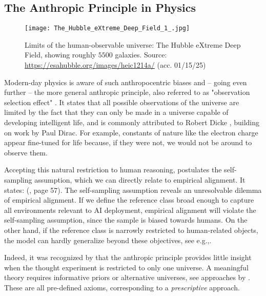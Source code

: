 \documentclass{article}
\theoremstyle{plain}
\theoremstyle{definition}
\theoremstyle{remark}
\begin{document}
\subsection{The Anthropic Principle in Physics}\label{sec:physics}

\begin{figure}
    \centering
    \texttt{[image: The\_Hubble\_eXtreme\_Deep\_Field\_1\_.jpg]}
    \caption{Limits of the human-observable universe: The Hubble eXtreme Deep Field, showing roughly $5500$ galaxies. Source: \url{https://esahubble.org/images/heic1214a/} (acc. 01/15/25)}
    \label{fig:enter-label}
\end{figure}

Modern-day physics is aware of such anthropocentric biases and -- going even further -- the more general anthropic principle, also referred to as "observation selection effect" \cite{bostrom2000observational,bostrom2002anthropic, carter1983principle}. It states that all possible observations of the universe are limited by the fact that they can only be made in a universe capable of developing intelligent life, and is commonly attributed to Robert Dicke \cite{dicke1961dirac,dicke1957gravitation}, building on work by Paul Dirac. For example, constants of nature like the electron charge appear fine-tuned for life because, if they were not, we would not be around to observe them.

Accepting this natural restriction to human reasoning, \citet{bostrom2002anthropic} postulates the self-sampling assumption, which we can directly relate to empirical alignment. It states:  (\citet{bostrom2000observational}, page 57). The self-sampling assumption reveals an unresolvable dilemma of empirical alignment. If we define the reference class broad enough to capture all environments relevant to AI deployment, empirical alignment will violate the self-sampling assumption, since the sample is biased towards humans. On the other hand, if the reference class is narrowly restricted to human-related objects, the model can hardly generalize beyond these objectives, see e.g.,\citet{yangposition}.   

Indeed, it was recognized by \citet{schmidhuber2000algorithmic,schmidhuber2002speed} that the anthropic principle provides little insight when the thought experiment is restricted to only one universe. A meaningful theory requires informative priors or alternative universes, see approaches by \citet{schmidhuber2000algorithmic,schmidhuber2002speed,bostrom2002anthropic}. These are all pre-defined axioms, corresponding to a \textit{prescriptive} approach. 
\end{document}
